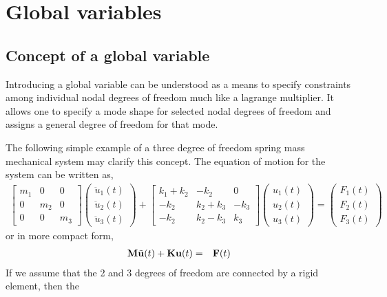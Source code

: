 \newpage
\section{Global variables}
\label{section:GlobalVariables}
\subsection{Concept of a global variable}
Introducing a global variable can be understood as 
a means to specify constraints among individual 
nodal degrees of freedom much like a lagrange
multiplier. It allows one to specify a mode shape
for selected nodal degrees of freedom and assigns
a general degree of freedom for that mode.

The following simple example of a three degree of
freedom spring mass mechanical system may clarify
this concept. The equation of motion for the system
can be written as,
\begin{eqnarray}
\left[
\begin{array}{ccc}
m_1 & 0   & 0   \\
0   & m_2 & 0   \\
0   & 0   & m_3 
\end{array}
\right]
\left(
\begin{array}{c}
\ddot{u}_1(t) \\
\ddot{u}_2(t) \\
\ddot{u}_3(t)
\end{array}
\right)
+
\left[
\begin{array}{ccc}
k_1+k_2 & -k_2       &    0 \\
-k_2    &  k_2 + k_3 & -k_3 \\
-k_2    &  k_2 - k_3 &  k_3 
\end{array}
\right]
\left(
\begin{array}{c}
{u}_1(t) \\
{u}_2(t) \\
{u}_3(t)
\end{array}
\right)
=
\left(
\begin{array}{c}
{F}_1(t) \\
{F}_2(t) \\
{F}_3(t)
\end{array}
\right)
\end{eqnarray}
or in more compact form,
\begin{eqnarray}
\mathbf{M}\ddot{\mathbf{u}}(t) + \mathbf{K}\mathbf{u}(t) &=& \mathbf{F}(t)
\end{eqnarray}
If we assume that the 2 and 3 degrees of freedom
are connected by a rigid element, then the
